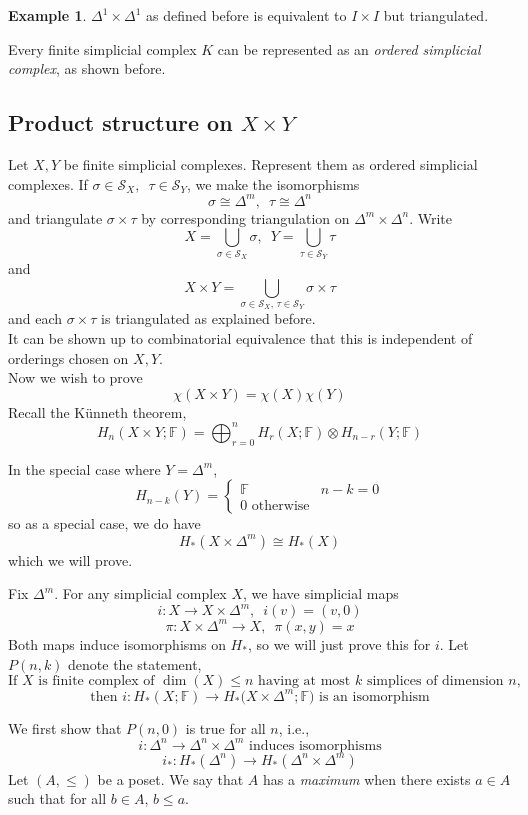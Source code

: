 \documentclass[a4paper,14pt]{extarticle}
\theoremstyle{definition}
\newtheorem*{eg}{Example}
\begin{document}
\begin{eg}
	$\Delta^1\times\Delta^1$ as defined before is equivalent to $I\times I$ but triangulated.
\end{eg}

Every finite simplicial complex $K$ can be represented as an \emph{ordered simplicial complex},
as shown before.

\subsection{Product structure on $X\times Y$}
Let $X,Y$ be finite simplicial complexes. Represent them as ordered simplicial complexes.
If $\sigma\in\mathcal{S}_X, \,\,\,\tau\in\mathcal{S}_Y$, we make the isomorphisms 
\[\sigma\cong\Delta^m, \,\,\,\tau\cong\Delta^n\] and triangulate $\sigma\times\tau$ by 
corresponding triangulation on $\Delta^m\times\Delta^n$.
Write \[X=\bigcup_{\sigma\in\mathcal{S}_X}\sigma,\,\,\,Y=\bigcup_{\tau\in\mathcal{S}_Y} \tau\]
and 
\[X\times Y=\bigcup_{\sigma\in\mathcal{S}_X, \,\tau\in\mathcal{S}_Y}\sigma\times\tau\]
and each $\sigma\times\tau$ is triangulated as explained before. \\

It can be shown up to combinatorial equivalence that this is independent of orderings chosen 
on $X,Y$. \\

Now we wish to prove 
\[\chi(X\times Y)=\chi(X)\chi(Y)\]
Recall the Künneth theorem,
\[H_n(X\times Y;\mathbb{F})=\bigoplus_{r=0}^n H_r(X;\mathbb{F})\otimes H_{n-r}(Y;\mathbb{F})\]

\noindent In the special case where $Y=\Delta^m$, 
\[H_{n-k}(Y)=\begin{cases}
	\mathbb{F}&n-k=0\\0\text{ otherwise}
\end{cases}\]
so as a special case, we do have 
\[H_*(X\times\Delta^m)\cong H_*(X)\]
which we will prove.

Fix $\Delta^m$. For any simplicial complex $X$, we have simplicial maps 
\[i:X\rightarrow X\times\Delta^m,\,\,\,i(v)=(v,0)\]
\[\pi:X\times\Delta^m\rightarrow X, \,\,\,\pi(x,y)=x\]
Both maps induce isomorphisms on $H_*$, so we will just prove this for $i$.
Let $P(n,k)$ denote the statement,
\[\text{If $X$ is finite complex of $\dim(X)\leq n$ having at most $k$ simplices 
of dimension $n$,}\]
\[\text{then $i:H_*(X;\mathbb{F})\rightarrow H_*(X\times\Delta^m;\mathbb{F}$) is
an isomorphism}\]

We first show that $P(n,0)$ is true for all $n$, i.e.,
\[i:\Delta^n\rightarrow\Delta^n\times\Delta^m\text{ induces isomorphisms}\]
\[i_*:H_*(\Delta^n)\rightarrow H_*(\Delta^n\times\Delta^m)\]
Let $(A,\leq)$ be a poset. We say that $A$ has a \emph{maximum} when there exists 
$a\in A$ such that for all $b\in A$, $b\leq a$.
\end{document}
